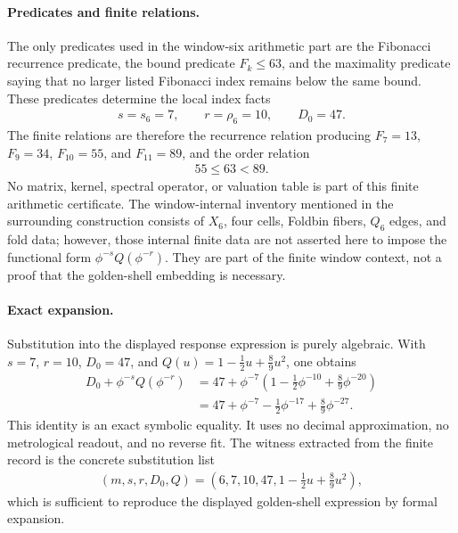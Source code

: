 \paragraph{Predicates and finite relations.}
The only predicates used in the window-six arithmetic part are the Fibonacci recurrence predicate, the bound predicate $F_k\leq 63$, and the maximality predicate saying that no larger listed Fibonacci index remains below the same bound. These predicates determine the local index facts
$$
\begin{aligned}
s=s_6=7,\qquad r=\rho_6=10,\qquad D_0=47.
\end{aligned}
$$
The finite relations are therefore the recurrence relation producing $F_7=13$, $F_9=34$, $F_{10}=55$, and $F_{11}=89$, and the order relation
$$
\begin{aligned}
55\leq 63<89.
\end{aligned}
$$
No matrix, kernel, spectral operator, or valuation table is part of this finite arithmetic certificate. The window-internal inventory mentioned in the surrounding construction consists of $X_6$, four cells, Foldbin fibers, $Q_6$ edges, and fold data; however, those internal finite data are not asserted here to impose the functional form $\phi^{-s}Q(\phi^{-r})$. They are part of the finite window context, not a proof that the golden-shell embedding is necessary.

\paragraph{Exact expansion.}
Substitution into the displayed response expression is purely algebraic. With $s=7$, $r=10$, $D_0=47$, and $Q(u)=1-\frac{1}{2}u+\frac{8}{9}u^2$, one obtains
$$
\begin{aligned}
D_0+\phi^{-s}Q(\phi^{-r})
&=47+\phi^{-7}\left(1-\frac{1}{2}\phi^{-10}+\frac{8}{9}\phi^{-20}\right)\\
&=47+\phi^{-7}-\frac{1}{2}\phi^{-17}+\frac{8}{9}\phi^{-27}.
\end{aligned}
$$
This identity is an exact symbolic equality. It uses no decimal approximation, no metrological readout, and no reverse fit. The witness extracted from the finite record is the concrete substitution list
$$
\begin{aligned}
(m,s,r,D_0,Q)=\left(6,7,10,47,1-\frac{1}{2}u+\frac{8}{9}u^2\right),
\end{aligned}
$$
which is sufficient to reproduce the displayed golden-shell expression by formal expansion.

